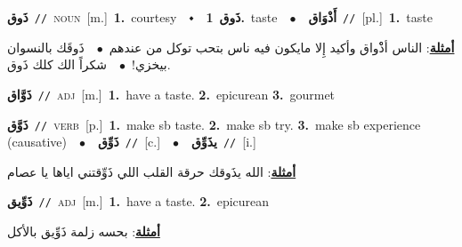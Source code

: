 \documentclass[10pt,a4paper,twoside]{article} %
\begin{document}
\begin{multicols}{2}
{\setlength\topsep{0pt}\textbf{\foreignlanguage{arabic}{ذَوق}}\ {\color{gray}\texttt{//}\color{black}}\ \textsc{noun}\ [m.]\ \textbf{1.}~courtesy\ \ $\smblkdiamond$\ \ \setlength\topsep{0pt}\textbf{\foreignlanguage{arabic}{ذَوق}}\ \textbf{1.}~taste\ \ $\bullet$\ \ \setlength\topsep{0pt}\textbf{\foreignlanguage{arabic}{أَذْوَاق}}\ {\color{gray}\texttt{//}\color{black}}\ [pl.]\ \textbf{1.}~taste\  \begin{flushright}\color{gray}\foreignlanguage{arabic}{\textbf{\underline{\foreignlanguage{arabic}{أمثلة}}}: الناس أذْْواق وأكيد إِلا مايكون فيه ناس بتحب توكل من عندهم\ $\bullet$\ \  ذَوقَك بالنسوان بيخزي!\ $\bullet$\ \  شكراً الك كلك ذَوق.}\end{flushright}\color{black}} \vspace{2mm}

{\setlength\topsep{0pt}\textbf{\foreignlanguage{arabic}{ذَوَّاق}}\ {\color{gray}\texttt{//}\color{black}}\ \textsc{adj}\ [m.]\ \textbf{1.}~have a taste.  \textbf{2.}~epicurean  \textbf{3.}~gourmet\ } \vspace{2mm}

{\setlength\topsep{0pt}\textbf{\foreignlanguage{arabic}{ذَوَّق}}\ {\color{gray}\texttt{//}\color{black}}\ \textsc{verb}\ [p.]\ \textbf{1.}~make sb taste.  \textbf{2.}~make sb try.  \textbf{3.}~make sb experience (causative)\ \ $\bullet$\ \ \setlength\topsep{0pt}\textbf{\foreignlanguage{arabic}{ذَوِّق}}\ {\color{gray}\texttt{//}\color{black}}\ [c.]\ \ $\bullet$\ \ \setlength\topsep{0pt}\textbf{\foreignlanguage{arabic}{يذَوِّق}}\ {\color{gray}\texttt{//}\color{black}}\ [i.]\  \begin{flushright}\color{gray}\foreignlanguage{arabic}{\textbf{\underline{\foreignlanguage{arabic}{أمثلة}}}: الله يذَوقك حرقة القلب اللي ذَوِّقتني اياها يا عصام}\end{flushright}\color{black}} \vspace{2mm}

{\setlength\topsep{0pt}\textbf{\foreignlanguage{arabic}{ذَوِّيق}}\ {\color{gray}\texttt{//}\color{black}}\ \textsc{adj}\ [m.]\ \textbf{1.}~have a taste.  \textbf{2.}~epicurean\  \begin{flushright}\color{gray}\foreignlanguage{arabic}{\textbf{\underline{\foreignlanguage{arabic}{أمثلة}}}: بحسه زلمة ذَوِّيق بالأكل}\end{flushright}\color{black}} \vspace{2mm}


\end{multicols}
\end{document}
